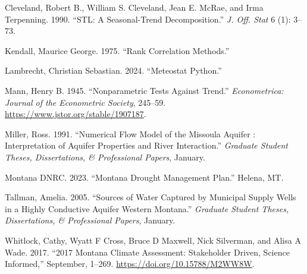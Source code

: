 \documentclass[
  letterpaper,
  DIV=11,
  numbers=noendperiod]{scrartcl}
\newlength{\cslhangindent}
\newenvironment{CSLReferences}[2] %
 {\begin{list}{}{%
  \setlength{\itemindent}{0pt}
  \setlength{\leftmargin}{0pt}
  \setlength{\parsep}{0pt}
  \ifodd #1
   \setlength{\leftmargin}{\cslhangindent}
   \setlength{\itemindent}{-1\cslhangindent}
  \fi
  \setlength{\itemsep}{#2\baselineskip}}}
 {\end{list}}
\begin{document}
\label{refs}
\begin{CSLReferences}{1}{0}
Cleveland, Robert B., William S. Cleveland, Jean E. McRae, and Irma
Terpenning. 1990. {``{STL}: {A} Seasonal-Trend Decomposition.''}
\emph{J. Off. Stat} 6 (1): 3--73.

Kendall, Maurice George. 1975. {``Rank Correlation Methods.''}

Lambrecht, Christian Sebastian. 2024. {``Meteostat {Python}.''}

Mann, Henry B. 1945. {``Nonparametric Tests Against Trend.''}
\emph{Econometrica: Journal of the Econometric Society}, 245--59.
\url{https://www.jstor.org/stable/1907187}.

Miller, Ross. 1991. {``Numerical Flow Model of the {Missoula Aquifer} :
Interpretation of Aquifer Properties and River Interaction.''}
\emph{Graduate Student Theses, Dissertations, \& Professional Papers},
January.

Montana DNRC. 2023. {``Montana {Drought Management Plan}.''} Helena, MT.

Tallman, Amelia. 2005. {``Sources of Water Captured by Municipal Supply
Wells in a Highly Conductive Aquifer Western {Montana}.''}
\emph{Graduate Student Theses, Dissertations, \& Professional Papers},
January.

Whitlock, Cathy, Wyatt F Cross, Bruce D Maxwell, Nick Silverman, and
Alisa A Wade. 2017. {``2017 {Montana Climate Assessment}: {Stakeholder}
Driven, Science Informed,''} September, 1--269.
\url{https://doi.org/10.15788/M2WW8W}.

\end{CSLReferences}
\end{document}
